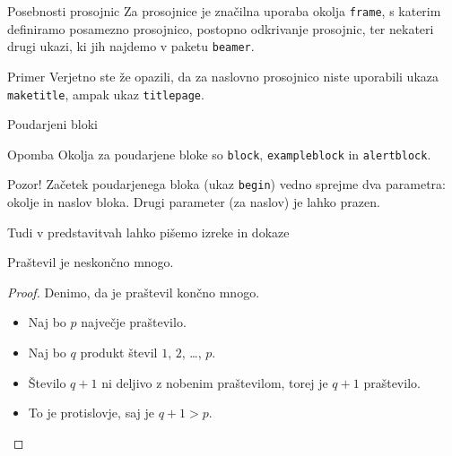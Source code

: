 
\begin{frame}{Posebnosti prosojnic}
	Za prosojnice je značilna uporaba okolja \texttt{frame},
	s katerim definiramo posamezno prosojnico,\pause
	postopno odkrivanje prosojnic, \pause 
	ter nekateri drugi ukazi, ki jih najdemo v paketu \texttt{beamer}.\pause
	\begin{exampleblock}{Primer}
		Verjetno ste že opazili, da za naslovno prosojnico niste uporabili
		ukaza \texttt{maketitle}, ampak ukaz \texttt{titlepage}.
	\end{exampleblock}
\end{frame}

\begin{frame}{Poudarjeni bloki}
	\begin{block}{Opomba}
		Okolja za poudarjene bloke so \texttt{block}, \texttt{exampleblock} in \texttt{alertblock}.
	 \end{block}

	\begin{alertblock}{Pozor!}
		Začetek poudarjenega bloka (ukaz \texttt{begin}) vedno sprejme 
		dva parametra: okolje in naslov bloka.
		Drugi parameter (za naslov) je lahko prazen. 
	\end{alertblock}
 \end{frame}

\begin{frame}{Tudi v predstavitvah lahko pišemo izreke in dokaze}
	\begin{izrek}
	   Praštevil je neskončno mnogo.
	\end{izrek}
	\begin{proof}
	   Denimo, da je praštevil končno mnogo.
	   \begin{itemize}[<+->]
		  \item Naj bo $p$ \alert<4>{največje} praštevilo.
		  \item Naj bo $q$ produkt števil $1$, $2$, \ldots, $p$.
		  \item Število $q+1$ ni deljivo z nobenim praštevilom, torej je $q+1$ praštevilo.
		  \item To je protislovje, saj je $q+1>p$. \qedhere
	   \end{itemize}
	\end{proof}
 \end{frame}
 